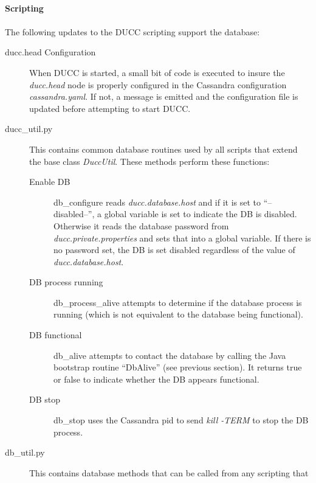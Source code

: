       \paragraph{Scripting}
      
      
      \paragraph{} 

      The following updates to the DUCC scripting support the database:
      \begin{description}
         \item[ducc.head Configuration] When DUCC is started, a small bit of code is executed to insure
           the {\em ducc.head} node is properly configured in the Cassandra configuration {\em
             cassandra.yaml}.  If not, a message is emitted and the configuration file is updated
           before attempting to start DUCC.
        \item[ducc\_util.py] This contains common database routines used by all scripts that extend
          the base class {\em DuccUtil}.  These methods perform these functions:
          \begin{description}
            \item[Enable DB] db\_configure reads {\em ducc.database.host} and if it is set to
              ``--disabled--'', a global variable is set to indicate the DB is disabled.  Otherwise
              it reads the database password from {\em ducc.private.properties} and sets that into
              a global variable.  If there is no password set, the DB is set disabled regardless of
              the value of {\em ducc.database.host}.
           \item[DB process running] db\_process\_alive attempts to determine if the database process
             is running (which is not equivalent to the database being functional).
           \item[DB functional] db\_alive attempts to contact the database by calling the Java bootstrap
             routine ``DbAlive'' (see previous section).  It returns true or false to indicate whether
             the DB appears functional.
           \item[DB stop] db\_stop uses the Cassandra pid to send {\em kill -TERM} to stop the DB process.
           \end{description}
         \item[db\_util.py] This contains database methods that can be called from any scripting that

\end{description}
